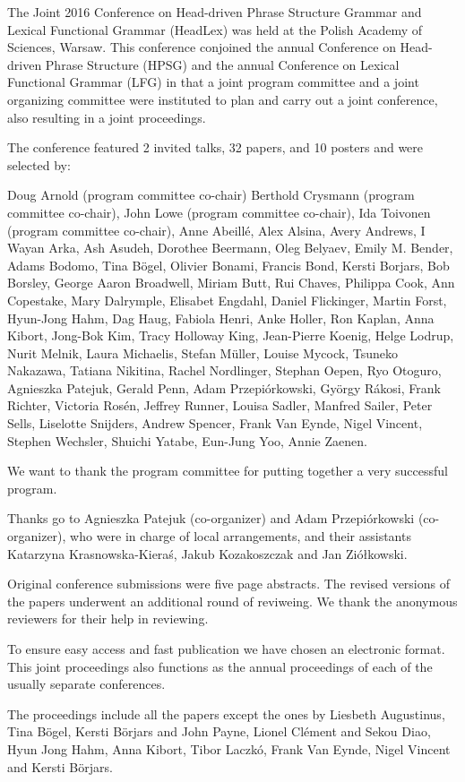 The Joint 2016 Conference on Head-driven Phrase Structure Grammar and
Lexical Functional Grammar (HeadLex) was held at the Polish Academy of
Sciences, Warsaw.  This conference conjoined the annual Conference on
Head-driven Phrase Structure (HPSG) and the annual Conference on
Lexical Functional Grammar (LFG) in that a joint program committee and
a joint organizing committee were instituted to plan and carry out a
joint conference, also resulting in a joint proceedings.

The conference featured 2 invited talks, 32 papers, and 10
posters and were selected by:  

Doug Arnold (program committee co-chair)
    Berthold Crysmann (program committee co-chair),
    John Lowe (program committee co-chair),
    Ida Toivonen (program committee co-chair),
Anne Abeillé,
    Alex Alsina,
    Avery Andrews,
    I Wayan Arka,
    Ash Asudeh,
    Dorothee Beermann,
    Oleg Belyaev,
    Emily M. Bender,
    Adams Bodomo,
    Tina Bögel,
    Olivier Bonami,
    Francis Bond,
    Kersti Borjars,
    Bob Borsley,
    George Aaron Broadwell,
    Miriam Butt,
    Rui Chaves,
    Philippa Cook,
    Ann Copestake,
    Mary Dalrymple,
    Elisabet Engdahl,
    Daniel Flickinger,
    Martin Forst,
    Hyun-Jong Hahm,
    Dag Haug,
    Fabiola Henri,
    Anke Holler,
    Ron Kaplan,
    Anna Kibort,
    Jong-Bok Kim,
    Tracy Holloway King,
    Jean-Pierre Koenig,
    Helge Lodrup,
    Nurit Melnik,
    Laura Michaelis,
    Stefan Müller,
    Louise Mycock,
    Tsuneko Nakazawa,
    Tatiana Nikitina,
    Rachel Nordlinger,
    Stephan Oepen,
    Ryo Otoguro,
    Agnieszka Patejuk,
    Gerald Penn,
    Adam Przepiórkowski,
    György Rákosi,
    Frank Richter,
    Victoria Rosén,
    Jeffrey Runner,
    Louisa Sadler,
    Manfred Sailer,
    Peter Sells,
    Liselotte Snijders,
    Andrew Spencer,
    Frank Van Eynde,
    Nigel Vincent,
    Stephen Wechsler,
    Shuichi Yatabe,
    Eun-Jung Yoo,
    Annie Zaenen.


We want to thank the program committee for putting together a very
successful program.

Thanks go to Agnieszka Patejuk (co-organizer) and Adam Przepiórkowski
(co-organizer), who were in charge of local arrangements, and their
assistants Katarzyna Krasnowska-Kieraś, Jakub Kozakoszczak and Jan
Ziółkowski.

 Original conference submissions were five page abstracts. The revised versions of the papers
underwent an additional round of reviweing. We thank the anonymous reviewers for their help in reviewing.

To ensure easy access and fast publication we have chosen an
electronic format. This joint proceedings also functions as the annual
proceedings of each of the usually separate conferences.


The proceedings include all the papers except the ones by 
Liesbeth Augustinus,
Tina Bögel, 
Kersti Börjars and John Payne, 
Lionel Clément and Sekou Diao, 
Hyun Jong Hahm, 
Anna Kibort, 
Tibor Laczkó, 
Frank Van Eynde, 
Nigel Vincent and Kersti Börjars.


